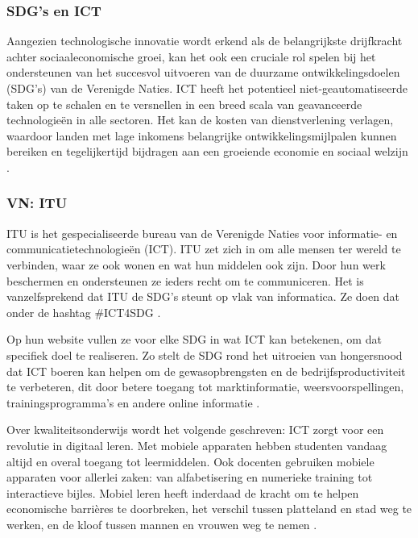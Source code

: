 \subsubsection{SDG's en ICT}
Aangezien technologische innovatie wordt erkend als de belangrijkste drijfkracht achter sociaaleconomische groei, kan het ook een cruciale rol spelen bij het ondersteunen van het succesvol uitvoeren van de duurzame ontwikkelingsdoelen (SDG's) van de Verenigde Naties. ICT heeft het potentieel niet-geautomatiseerde taken op te schalen en te versnellen in een breed scala van geavanceerde technologieën in alle sectoren. Het kan de kosten van dienstverlening verlagen, waardoor landen met lage inkomens belangrijke ontwikkelingsmijlpalen kunnen bereiken en tegelijkertijd bijdragen aan een groeiende economie en sociaal welzijn \autocite{Ameyed2018}.

\subsubsection{VN: ITU}
ITU is het gespecialiseerde bureau van de Verenigde Naties voor informatie- en communicatietechnologieën (ICT). ITU zet zich in om alle mensen ter wereld te verbinden, waar ze ook wonen en wat hun middelen ook zijn. Door hun werk beschermen en ondersteunen ze ieders recht om te communiceren.
Het is vanzelfsprekend dat ITU de SDG's steunt op vlak van informatica. Ze doen dat onder de hashtag \#ICT4SDG \autocite{ITU2015}.

Op hun website vullen ze voor elke SDG in wat ICT kan betekenen, om dat specifiek doel te realiseren. Zo stelt de SDG rond het uitroeien van hongersnood dat ICT boeren kan helpen om de gewasopbrengsten en de bedrijfsproductiviteit te verbeteren, dit door betere toegang tot marktinformatie, weersvoorspellingen, trainingsprogramma's en andere online informatie \autocite{ITU2015}.

Over kwaliteitsonderwijs wordt het volgende geschreven: ICT zorgt voor een revolutie in digitaal leren. Met mobiele apparaten hebben studenten vandaag altijd en overal toegang tot leermiddelen. Ook docenten gebruiken mobiele apparaten voor allerlei zaken: van alfabetisering en numerieke training tot interactieve bijles. Mobiel leren heeft inderdaad de kracht om te helpen economische barrières te doorbreken, het verschil tussen platteland en stad weg te werken, en de kloof tussen mannen en vrouwen weg te nemen \autocite{ITU2015}.


